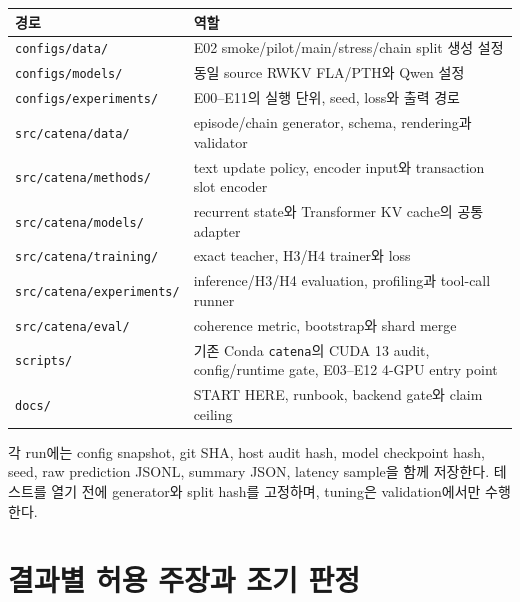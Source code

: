 \documentclass[10.5pt,a4paper]{article}
\newcommand{\code}[1]{\texttt{#1}}
\begin{document}
\begin{tabularx}{\textwidth}{@{}L{47mm}Y@{}}
\toprule
경로 & 역할 \\
\midrule
\code{configs/data/} & E02 smoke/pilot/main/stress/chain split 생성 설정 \\
\code{configs/models/} & 동일 source RWKV FLA/PTH와 Qwen 설정 \\
\code{configs/experiments/} & E00--E11의 실행 단위, seed, loss와 출력 경로 \\
\code{src/catena/data/} & episode/chain generator, schema, rendering과 validator \\
\code{src/catena/methods/} & text update policy, encoder input와 transaction slot encoder \\
\code{src/catena/models/} & recurrent state와 Transformer KV cache의 공통 adapter \\
\code{src/catena/training/} & exact teacher, H3/H4 trainer와 loss \\
\code{src/catena/experiments/} & inference/H3/H4 evaluation, profiling과 tool-call runner \\
\code{src/catena/eval/} & coherence metric, bootstrap와 shard merge \\
\code{scripts/} & 기존 Conda \code{catena}의 CUDA 13 audit, config/runtime gate, E03--E12 4-GPU entry point \\
\code{docs/} & START HERE, runbook, backend gate와 claim ceiling \\
\bottomrule
\end{tabularx}

각 run에는 config snapshot, git SHA, host audit hash, model checkpoint hash, seed, raw prediction JSONL, summary JSON, latency sample을 함께 저장한다. 테스트를 열기 전에 generator와 split hash를 고정하며, tuning은 validation에서만 수행한다.

\section{결과별 허용 주장과 조기 판정}
\end{document}
